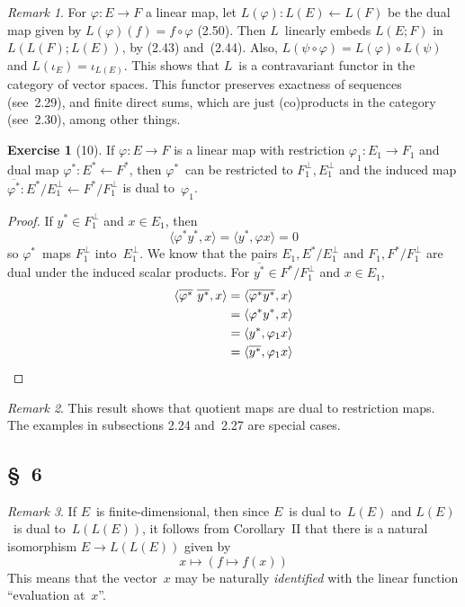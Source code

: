 \documentclass[letterpaper,12pt]{article}
\newcommand{\from}{\leftarrow}
\newcommand{\after}{\circ}
\newcommand{\sprod}[2]{\langle#1,#2\rangle}
\newcommand{\oc}[1]{#1^{\perp}}
\newcommand{\proj}[1]{\overline{#1}}
\theoremstyle{definition}
\newtheorem*{exer}{Exercise}
\theoremstyle{remark}
\newtheorem*{rmk}{Remark}
\begin{document}
\begin{rmk}
For \(\varphi:E\to F\) a linear map, let \(L(\varphi):L(E)\from L(F)\) be the dual map given by \(L(\varphi)(f)=f\after\varphi\) (2.50). Then \(L\)~linearly embeds \(L(E;F)\) in \(L(L(F);L(E))\), by (2.43) and~(2.44). Also, \(L(\psi\after\varphi)=L(\varphi)\after L(\psi)\) and \(L(\iota_{E})=\iota_{L(E)}\). This shows that \(L\)~is a contravariant functor in the category of vector spaces. This functor preserves exactness of sequences (see~2.29), and finite direct sums, which are just (co)products in the category (see~2.30), among other things.
\end{rmk}

\begin{exer}[10]
If \(\varphi:E\to F\) is a linear map with restriction \(\varphi_1:E_1\to F_1\) and dual map \(\varphi^*:E^*\from F^*\), then \(\varphi^*\)~can be restricted to \(\oc{F_1},\oc{E_1}\) and the induced map \(\proj{\varphi^*}:E^*/\oc{E_1}\from F^*/\oc{F_1}\) is dual to~\(\varphi_1\).
\end{exer}
\begin{proof}
If \(y^*\in\oc{F_1}\) and \(x\in E_1\), then
\[\sprod{\varphi^*y^*}{x}=\sprod{y^*}{\varphi x}=0\]
so \(\varphi^*\)~maps \(\oc{F_1}\) into~\(\oc{E_1}\). We know that the pairs \(E_1,E^*/\oc{E_1}\) and \(F_1,F^*/\oc{F_1}\) are dual under the induced scalar products. For \(\proj{y^*}\in F^*/\oc{F_1}\) and \(x\in E_1\),
\begin{align*}
\sprod{\proj{\varphi^*}\ \proj{y^*}}{x}&=\sprod{\proj{\varphi^* y^*}}{x}\\
	&=\sprod{\varphi^* y^*}{x}\\
	&=\sprod{y^*}{\varphi_1 x}\\
	&=\sprod{\proj{y^*}}{\varphi_1 x}\qedhere
\end{align*}
\end{proof}
\begin{rmk}
This result shows that quotient maps are dual to restriction maps. The examples in subsections 2.24 and~2.27 are special cases.
\end{rmk}

\subsection*{\S~6}
\begin{rmk}
If \(E\)~is finite-dimensional, then since \(E\)~is dual to~\(L(E)\) and \(L(E)\)~is dual to~\(L(L(E))\), it follows from Corollary~II that there is a natural isomorphism \(E\to L(L(E))\) given by
\[x\mapsto(f\mapsto f(x))\]
This means that the vector~\(x\) may be naturally \emph{identified} with the linear function ``evaluation at~\(x\)''.
\end{rmk}
\end{document}
